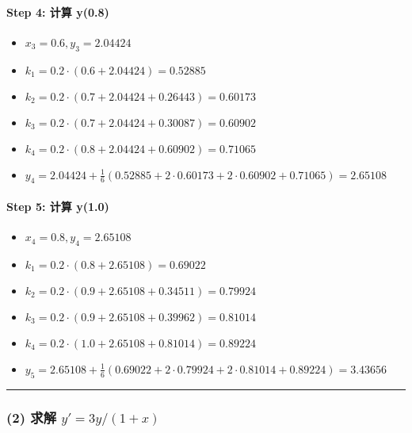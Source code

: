 \documentclass[11pt]{article}
\providecommand{\tightlist}{%
      \setlength{\itemsep}{0pt}\setlength{\parskip}{0pt}}
\begin{document}
\paragraph{Step 4: 计算 y(0.8)}\label{step-4-ux8ba1ux7b97-y0.8}

\begin{itemize}
\tightlist
\item
  \(x_3 = 0.6, y_3 = 2.04424\)
\item
  \(k_1 = 0.2 \cdot (0.6 + 2.04424) = 0.52885\)
\item
  \(k_2 = 0.2 \cdot (0.7 + 2.04424 + 0.26443) = 0.60173\)
\item
  \(k_3 = 0.2 \cdot (0.7 + 2.04424 + 0.30087) = 0.60902\)
\item
  \(k_4 = 0.2 \cdot (0.8 + 2.04424 + 0.60902) = 0.71065\)
\item
  \(y_4 = 2.04424 + \frac{1}{6}(0.52885 + 2 \cdot 0.60173 + 2 \cdot 0.60902 + 0.71065) = \mathbf{2.65108}\)
\end{itemize}

\paragraph{Step 5: 计算 y(1.0)}\label{step-5-ux8ba1ux7b97-y1.0}

\begin{itemize}
\tightlist
\item
  \(x_4 = 0.8, y_4 = 2.65108\)
\item
  \(k_1 = 0.2 \cdot (0.8 + 2.65108) = 0.69022\)
\item
  \(k_2 = 0.2 \cdot (0.9 + 2.65108 + 0.34511) = 0.79924\)
\item
  \(k_3 = 0.2 \cdot (0.9 + 2.65108 + 0.39962) = 0.81014\)
\item
  \(k_4 = 0.2 \cdot (1.0 + 2.65108 + 0.81014) = 0.89224\)
\item
  \(y_5 = 2.65108 + \frac{1}{6}(0.69022 + 2 \cdot 0.79924 + 2 \cdot 0.81014 + 0.89224) = \mathbf{3.43656}\)
\end{itemize}

\begin{center}\rule{0.5\linewidth}{0.5pt}\end{center}

\subsubsection{\texorpdfstring{(2) 求解
\(y' = 3y/(1 + x)\)}{(2) 求解 y\textquotesingle{} = 3y/(1 + x)}}\label{ux6c42ux89e3-y-3y1-x}
\end{document}
